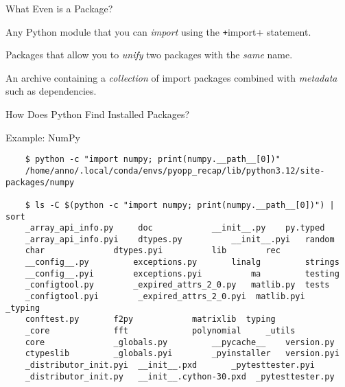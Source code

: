\secslide[\fontsize{1.3cm}{1.3cm}\selectfont]{Packaging: The Basics}


\begin{frame}{What Even is a Package?}
  \begin{description}
    \setlength{\itemsep}{1.5em}
    \item [\texttt{Import Package}] Any Python module that you can \emph{import} using the \texttt+import+
      statement.
    \item [\texttt{Namespace Package}] Packages that allow you to \emph{unify} two packages with the \emph{same} name.
    \item [\texttt{Distribution Package}] An archive containing a \emph{collection} of import packages combined with
      \emph{metadata} such as dependencies.
  \end{description}
  \vspace{1cm}
\end{frame}

\begin{darkframe}{How Does Python Find Installed Packages?}
  \begin{center}
  \huge\textcolor{ccyan}{Example: NumPy}
  \end{center}
  \vspace{0.5cm}
  \begin{verbatim}
    $ python -c "import numpy; print(numpy.__path__[0])"
    /home/anno/.local/conda/envs/pyopp_recap/lib/python3.12/site-packages/numpy

    $ ls -C $(python -c "import numpy; print(numpy.__path__[0])") | sort
    _array_api_info.py     doc		      __init__.py	 py.typed
    _array_api_info.pyi    dtypes.py	      __init__.pyi	 random
    char		      dtypes.pyi	      lib		 rec
    __config__.py	      exceptions.py	      linalg		 strings
    __config__.pyi	      exceptions.pyi	      ma		 testing
    _configtool.py	      _expired_attrs_2_0.py   matlib.py	 tests
    _configtool.pyi        _expired_attrs_2_0.pyi  matlib.pyi	 _typing
    conftest.py	      f2py		      matrixlib	 typing
    _core		      fft		      polynomial	 _utils
    core		      _globals.py	      __pycache__	 version.py
    ctypeslib	      _globals.pyi	      _pyinstaller	 version.pyi
    _distributor_init.pyi  __init__.pxd	      _pytesttester.pyi
    _distributor_init.py   __init__.cython-30.pxd  _pytesttester.py
  \end{verbatim}
\end{darkframe}



